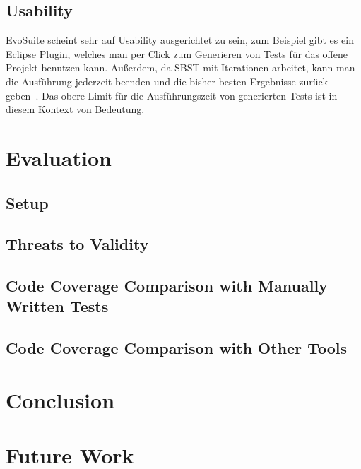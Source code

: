 \documentclass{article}
\begin{document}
\subsection{Usability}
EvoSuite scheint sehr auf Usability ausgerichtet zu sein, zum Beispiel gibt es ein Eclipse Plugin, welches man per Click zum Generieren von Tests für das offene Projekt benutzen kann. Außerdem, da SBST mit Iterationen arbeitet, kann man die Ausführung jederzeit beenden und die bisher besten Ergebnisse zurück geben~\cite{Harman2015}. Das obere Limit für die Ausführungszeit von generierten Tests ist in diesem Kontext von Bedeutung. 
\section{Evaluation}
\subsection{Setup}
\subsection{Threats to Validity}
\subsection{Code Coverage Comparison with Manually Written Tests}
\subsection{Code Coverage Comparison with Other Tools}


\section{Conclusion}

\section{Future Work}

\appendix





\end{document}

